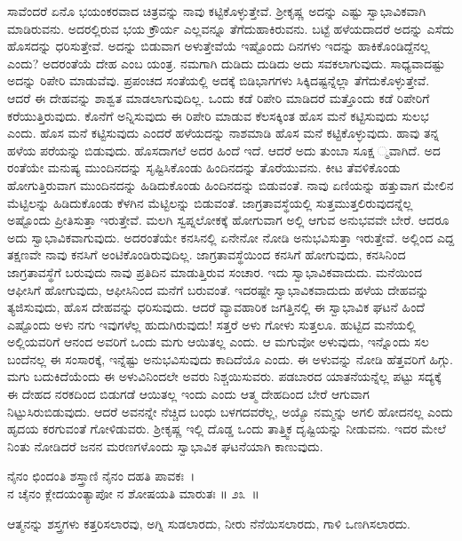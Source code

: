 ಸಾವೆಂದರೆ ಏನೊ ಭಯಂಕರವಾದ ಚಿತ್ರವನ್ನು ನಾವು ಕಟ್ಟಿಕೊಳ್ಳುತ್ತೇವೆ. ಶ‍್ರೀಕೃಷ್ಣ ಅದನ್ನು ಎಷ್ಟು ಸ್ವಾಭಾವಿಕವಾಗಿ ಮಾಡಿರುವನು. ಅದರಲ್ಲಿರುವ ಭಯ ಕ್ರೌರ್ಯ ಎಲ್ಲವನ್ನೂ ತೆಗೆದುಹಾಕಿರುವನು. ಬಟ್ಟೆ ಹಳೆಯದಾದರೆ ಅದನ್ನು ಎಸೆದು ಹೊಸದನ್ನು ಧರಿಸುತ್ತೇವೆ. ಅದನ್ನು ಬಿಡುವಾಗ ಅಳುತ್ತೇವೆಯೆ ಇಷ್ಟೊಂದು ದಿನಗಳು ಇದನ್ನು ಹಾಕಿಕೊಂಡಿದ್ದೆನಲ್ಲ ಎಂದು? ಅದರಂತೆಯೆ ದೇಹ ಎಂಬ ಯಂತ್ರ. ನಮಗಾಗಿ ದುಡಿದು ದುಡಿದು ಅದು ಸವಕಲಾಗುವುದು. ಸಾಧ್ಯವಾದಷ್ಟು ಅದನ್ನು ರಿಪೇರಿ ಮಾಡುವೆವು. ಪ್ರಪಂಚದ ಸಂತೆಯಲ್ಲಿ ಅದಕ್ಕೆ ಬಿಡಿಭಾಗಗಳು ಸಿಕ್ಕಿದಷ್ಟನ್ನೆಲ್ಲಾ ತೆಗೆದುಕೊಳ್ಳುತ್ತೇವೆ. ಆದರೆ ಈ ದೇಹವನ್ನು ಶಾಶ್ವತ ಮಾಡಲಾಗುವುದಿಲ್ಲ. ಒಂದು ಕಡೆ ರಿಪೇರಿ ಮಾಡಿದರೆ ಮತ್ತೊಂದು ಕಡೆ ರಿಪೇರಿಗೆ ಕರೆಯುತ್ತಿರುವುದು. ಕೊನೆಗೆ ಅನ್ನಿಸುವುದು ಈ ರಿಪೇರಿ ಮಾಡುವ ಕೆಲಸಕ್ಕಿಂತ ಹೊಸ ಮನೆ ಕಟ್ಟಿಸುವುದು ಸುಲಭ ಎಂದು. ಹೊಸ ಮನೆ ಕಟ್ಟಿಸುವುದು ಎಂದರೆ ಹಳೆಯದನ್ನು ನಾಶಮಾಡಿ ಹೊಸ ಮನೆ ಕಟ್ಟಿಕೊಳ್ಳುವುದು. ಹಾವು ತನ್ನ ಹಳೆಯ ಪರೆಯನ್ನು ಬಿಡುವುದು. ಹೊಸದಾಗಲೆ ಅದರ ಹಿಂದೆ ಇದೆ. ಆದರೆ ಅದು ತುಂಬಾ ಸೂಕ್ಷ ್ಮವಾಗಿದೆ. ಅದ ರಂತೆಯೇ ಮನುಷ್ಯ ಮುಂದಿನದನ್ನು ಸೃಷ್ಟಿಸಿಕೊಂಡು ಹಿಂದಿನದನ್ನು ತೊರೆಯುವನು. ಕೀಟ ತೆವಳಿಕೊಂಡು ಹೋಗುತ್ತಿರುವಾಗ ಮುಂದಿನದನ್ನು ಹಿಡಿದುಕೊಂಡು ಹಿಂದಿನದನ್ನು ಬಿಡುವಂತೆ. ನಾವು ಏಣಿಯನ್ನು ಹತ್ತುವಾಗ ಮೇಲಿನ ಮೆಟ್ಟಿಲನ್ನು ಹಿಡಿದುಕೊಂಡು ಕೆಳಗಿನ ಮೆಟ್ಟಿಲನ್ನು ಬಿಡುವಂತೆ. ಜಾಗ್ರತಾವಸ್ಥೆಯಲ್ಲಿ ಸುತ್ತಮುತ್ತಲಿರುವುದನ್ನೆಲ್ಲ ಅಷ್ಟೊಂದು ಪ್ರೀತಿಸುತ್ತಾ ಇರುತ್ತೇವೆ. ಮಲಗಿ ಸ್ವಪ್ನಲೋಕಕ್ಕೆ ಹೋಗುವಾಗ ಅಲ್ಲಿ ಆಗುವ ಅನುಭವವೇ ಬೇರೆ. ಆದರೂ ಅದು ಸ್ವಾಭಾವಿಕವಾಗುವುದು. ಅದರಂತೆಯೇ ಕನಸಿನಲ್ಲಿ ಏನೇನೋ ನೋಡಿ ಅನುಭವಿಸುತ್ತಾ ಇರುತ್ತೇವೆ. ಅಲ್ಲಿಂದ ಎದ್ದ ತಕ್ಷಣವೇ ನಾವು ಕನಸಿಗೆ ಅಂಟಿಕೊಂಡಿರುವುದಿಲ್ಲ. ಜಾಗ್ರತಾವಸ್ಥೆಯಿಂದ ಕನಸಿಗೆ ಹೋಗುವುದು, ಕನಸಿನಿಂದ ಜಾಗ್ರತಾವಸ್ಥೆಗೆ ಬರುವುದು ನಾವು ಪ್ರತಿದಿನ ಮಾಡುತ್ತಿರುವ ಸಂಚಾರ. ಇದು ಸ್ವಾಭಾವಿಕವಾದುದು. ಮನೆಯಿಂದ ಆಫೀಸಿಗೆ ಹೋಗುವುದು, ಆಫೀಸಿನಿಂದ ಮನೆಗೆ ಬರುವಂತೆ. ಇದರಷ್ಟೇ ಸ್ವಾಭಾವಿಕವಾದುದು ಹಳೆಯ ದೇಹವನ್ನು ತ್ಯಜಿಸುವುದು, ಹೊಸ ದೇಹವನ್ನು ಧರಿಸುವುದು. ಆದರೆ ವ್ಯಾವಹಾರಿಕ ಜಗತ್ತಿನಲ್ಲಿ ಈ ಸ್ವಾಭಾವಿಕ ಘಟನೆ ಹಿಂದೆ ಎಷ್ಟೊಂದು ಅಳು ನಗು ಇವುಗಳೆಲ್ಲ ಹುದುಗಿರುವುದು! ಸತ್ತರೆ ಅಳು ಗೋಳು ಸುತ್ತಲೂ. ಹುಟ್ಟಿದ ಮನೆಯಲ್ಲಿ ಅಲ್ಲಿಯವರಿಗೆ ಆನಂದ ಅವರಿಗೆ ಒಂದು ಮಗು ಆಯಿತಲ್ಲ ಎಂದು. ಆ ಮಗುವೋ ಅಳುವುದು, ಇನ್ನೊಂದು ಸಲ ಬಂದೆನಲ್ಲ ಈ ಸಂಸಾರಕ್ಕೆ, ಇನ್ನೆಷ್ಟು ಅನುಭವಿಸುವುದು ಕಾದಿದೆಯೊ ಎಂದು. ಈ ಅಳುವನ್ನು ನೋಡಿ ಹೆತ್ತವರಿಗೆ ಹಿಗ್ಗು. ಮಗು ಬದುಕಿದೆಯೆಂದು ಈ ಅಳುವಿನಿಂದಲೇ ಅವರು ನಿಶ್ಚಯಿಸುವರು. ಪಡಬಾರದ ಯಾತನೆಯನ್ನೆಲ್ಲ ಪಟ್ಟು ಸದ್ಯಕ್ಕೆ ಈ ದೇಹದ ನರಕದಿಂದ ಬಿಡುಗಡೆ ಆಯಿತಲ್ಲ ಇಂದು ಎಂದು ಆತ್ಮ ದೇಹದಿಂದ ಬೇರೆ ಆಗುವಾಗ ನಿಟ್ಟುಸಿರುಬಿಡುವುದು. ಆದರೆ ಅವನನ್ನೇ ನೆಚ್ಚಿದ ಬಂಧು ಬಳಗದವರೆಲ್ಲ, ಅಯ್ಯೊ ನಮ್ಮನ್ನು ಅಗಲಿ ಹೋದನಲ್ಲ ಎಂದು ಹೃದಯ ಕರಗುವಂತೆ ಗೋಳಿಡುವರು. ಶ‍್ರೀಕೃಷ್ಣ ಇಲ್ಲಿ ದೊಡ್ಡ ಒಂದು ತಾತ್ತ್ವಿಕ ದೃಷ್ಟಿಯನ್ನು ನೀಡುವನು. ಇದರ ಮೇಲೆ ನಿಂತು ನೋಡಿದರೆ ಜನನ ಮರಣಗಳೊಂದು ಸ್ವಾಭಾವಿಕ ಘಟನೆಯಾಗಿ ಕಾಣುವುದು.

\begin{shloka}
ನೈನಂ ಛಿಂದಂತಿ ಶಸ್ತ್ರಾಣಿ ನೈನಂ ದಹತಿ ಪಾವಕಃ~।\\ನ ಚೈನಂ ಕ್ಲೇದಯಂತ್ಯಾಪೋ ನ ಶೋಷಯತಿ ಮಾರುತಃ \hfill॥ ೨೩~॥
\end{shloka}

\begin{artha}
ಆತ್ಮನನ್ನು ಶಸ್ತ್ರಗಳು ಕತ್ತರಿಸಲಾರವು, ಅಗ್ನಿ ಸುಡಲಾರದು, ನೀರು ನೆನೆಯಿಸಲಾರದು, ಗಾಳಿ ಒಣಗಿಸಲಾರದು.
\end{artha}

